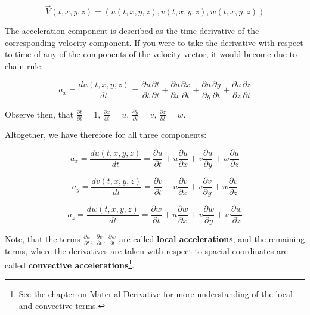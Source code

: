 \begin{equation}
\vec{V}(t, x, y, z) = (u(t, x, y, z), v(t, x, y, z), w(t, x, y, z))
\end{equation}

The acceleration component is described as the time derivative of the corresponding velocity component. If you were to take the derivative with respect to time of any of the components of the velocity vector, it would become due to chain rule:

\begin{equation}
a_x = \frac{d u(t,x,y,z)}{dt} = \frac{\partial u}{\partial t} \frac{\partial t}{\partial t} + \frac{\partial u}{\partial x} \frac{\partial x}{\partial t} + \frac{\partial u}{\partial y} \frac{\partial y}{\partial t} + \frac{\partial u}{\partial z} \frac{\partial z}{\partial t}
\end{equation}

Observe then, that $\frac{\partial t}{\partial t} = 1$, $\frac{\partial x}{\partial t} = u$, $\frac{\partial y}{\partial t} = v$, $\frac{\partial z}{\partial t} = w$.

Altogether, we have therefore for all three components:

\begin{equation}
a_x = \frac{d u(t,x,y,z)}{dt} = \frac{\partial u}{\partial t} + u \frac{\partial u}{\partial x} + v \frac{\partial u}{\partial y} + w \frac{\partial u}{\partial z}
\end{equation}

\begin{equation}
a_y = \frac{d v(t,x,y,z)}{dt} = \frac{\partial v}{\partial t} + u \frac{\partial v}{\partial x} + v \frac{\partial v}{\partial y} + w \frac{\partial v}{\partial z}
\end{equation}

\begin{equation}
a_z = \frac{d w(t,x,y,z)}{dt} = \frac{\partial w}{\partial t} + u \frac{\partial w}{\partial x} + v \frac{\partial w}{\partial y} + w \frac{\partial w}{\partial z}
\end{equation}

Note, that the terms $\frac{\partial u}{\partial t}$, $\frac{\partial v}{\partial t}$, $\frac{\partial w}{\partial t}$ are called \textbf{local accelerations}, and the remaining terms, where the derivatives are taken with respect to spacial coordinates are called \textbf{convective accelerations}\footnote{See the chapter on Material Derivative for more understanding of the local and convective terms.}.


